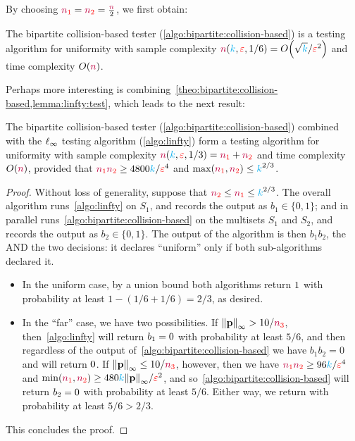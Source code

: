 \noindent By choosing $\nss=\nst=\frac{\ns}{2}$, we first obtain:
\begin{corollary}
  \label{theo:bipartite:collision-based:notradeoff}
The bipartite collision-based tester (\cref{algo:bipartite:collision-based}) is a testing algorithm for uniformity with sample complexity $\ns(\ab,\dst,1/6) = \bigO{\sqrt{\ab}/\dst^2}$ and time complexity $O(\ns)$.
\end{corollary}
Perhaps more interesting is combining~\cref{theo:bipartite:collision-based,lemma:linfty:test}, which leads to the next result:
\begin{corollary}
  \label{theo:bipartite:collision-based}
The bipartite collision-based tester (\cref{algo:bipartite:collision-based}) combined with the $\lp[\infty]$ testing algorithm (\cref{algo:linfty}) form a testing algorithm for uniformity with sample complexity $\ns(\ab,\dst,1/3) = \nss+\nst$ and time complexity $O(\ns)$, provided that $\nss\nst \geq 4800\ab/\dst^4$ and $\max(\nss,\nst)\leq \ab^{2/3}$.
\end{corollary}
\begin{proof}
Without loss of generality, suppose that $\nst\leq\nss\leq \ab^{2/3}$. The overall algorithm runs~\cref{algo:linfty} on $S_1$, and records the output as $b_1\in\{0,1\}$; and in parallel runs~\cref{algo:bipartite:collision-based} on the multisets $S_1$ and $S_2$, and records the output as $b_2\in\{0,1\}$. The output of the algorithm is then $b_1b_2$, \ie the \textsf{AND} the two decisions: it declares ``uniform'' only if both sub-algorithms declared it.
\begin{itemize}
    \item In the uniform case, by a union bound both algorithms return $\accept$ with probability at least $1-(1/6+1/6)=2/3$, as desired.
    \item In the ``far'' case, we have two possibilities. If $\norminf{\p} > 10/\nsu$, then~\cref{algo:linfty} will return $b_1=\reject$ with probability at least $5/6$, and then regardless of the output of~\cref{algo:bipartite:collision-based} we have $b_1b_2=0$ and will return $\reject$. If $\norminf{\p} \leq 10/\nsu$, however, then we have $\nss\nst \geq 96\ab/\dst^4$ and $\min(\nss,\nst)\geq 480\ab\norminf{\p}/\dst^2$, and so~\cref{algo:bipartite:collision-based} will return $b_2=\reject$ with probability at least $5/6$. Either way, we return \reject with probability at least $5/6>2/3$.
\end{itemize}
This concludes the proof.
\end{proof}

